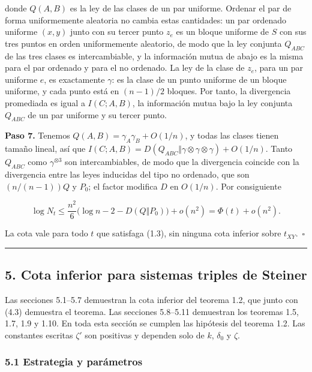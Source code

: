 \documentclass[spanish,11pt,a4paper]{article}
\begin{document}
donde \(Q(A,B)\) es la ley de las clases de un par uniforme. Ordenar el par de forma uniformemente aleatoria no cambia estas cantidades: un par ordenado uniforme \((x,y)\) junto con su tercer punto \(z_e\) es un bloque uniforme de \(S\) con sus tres puntos en orden uniformemente aleatorio, de modo que la ley conjunta \(Q_{ABC}\) de las tres clases es intercambiable, y la información mutua de abajo es la misma para el par ordenado y para el no ordenado. La ley de la clase de \(z_e\), para un par uniforme \(e\), es exactamente \(\gamma\): es la clase de un punto uniforme de un bloque uniforme, y cada punto está en \((n-1)/2\) bloques. Por tanto, la divergencia promediada es igual a \(I(C;A,B)\), la información mutua bajo la ley conjunta \(Q_{ABC}\) de un par uniforme y su tercer punto.

\textbf{Paso 7.} Tenemos \(Q(A,B)=\gamma_A\gamma_B+O(1/n)\), y todas las clases tienen tamaño lineal, así que \(I(C;A,B)=D(Q_{ABC}\Vert\gamma\otimes\gamma\otimes\gamma)+O(1/n)\). Tanto \(Q_{ABC}\) como \(\gamma^{\otimes3}\) son intercambiables, de modo que la divergencia coincide con la divergencia entre las leyes inducidas del tipo no ordenado, que son \((n/(n-1))Q\) y \(P_0\); el factor modifica \(D\) en \(O(1/n)\). Por consiguiente

\nopagebreak[4]
\[\log N_t\le\frac{n^2}{6}\big(\log n-2-D(Q\Vert P_0)\big)+o(n^2)=\Phi(t)+o(n^2).\tag{4.3}\]

La cota vale para todo \(t\) que satisfaga (1.3), sin ninguna cota inferior sobre \(t_{XY}\).~\(\square\)

\begin{center}\rule{0.5\linewidth}{0.5pt}\end{center}

\subsection{5. Cota inferior para sistemas triples de Steiner}\label{cota-inferior-para-sistemas-triples-de-steiner}

Las secciones 5.1--5.7 demuestran la cota inferior del teorema 1.2, que junto con (4.3) demuestra el teorema. Las secciones 5.8--5.11 demuestran los teoremas 1.5, 1.7, 1.9 y 1.10. En toda esta sección se cumplen las hipótesis del teorema 1.2. Las constantes escritas \(\zeta'\) son positivas y dependen solo de \(k\), \(\delta_0\) y \(\zeta\).

\subsubsection{5.1 Estrategia y parámetros}\label{estrategia-y-paruxe1metros}
\end{document}
